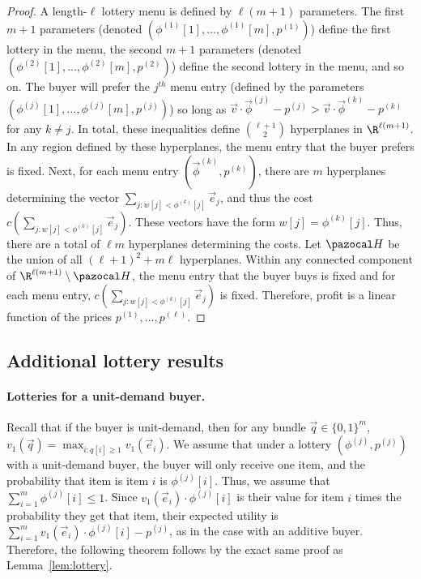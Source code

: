 \lottery*

\begin{proof}
	A length-$\ell$ lottery menu is defined by $\ell(m+1)$ parameters. The first $m+1$ parameters (denoted $\left(\phi^{(1)}[1], \dots, \phi^{(1)}[m], p^{(1)}\right)$) define the first lottery in the menu, the second $m+1$ parameters (denoted $\left(\phi^{(2)}[1], \dots, \phi^{(2)}[m], p^{(2)}\right)$) define the second lottery in the menu, and so on. The buyer will prefer the $j^{th}$ menu entry (defined by the parameters $\left(\phi^{(j)}[1], \dots, \phi^{(j)}[m], p^{(j)}\right)$)  so long as
	$\vec{v} \cdot \vec{\phi}^{(j)} - p^{(j)}> \vec{v} \cdot \vec{\phi}^{(k)}- p^{(k)}$ for any $k \not=j$. In total, these inequalities define ${\ell+1 \choose 2}$ hyperplanes in $\R^{\ell(m+1)}$. In any region defined by these hyperplanes, the menu entry that the buyer prefers is fixed. Next, for each menu entry $\left(\vec{\phi}^{(k)}, p^{(k)}\right)$, there are $m$ hyperplanes determining the vector $\sum_{j: w[j] < \phi^{(k)}[j]} \vec{e}_j$, and thus the cost  $c \left(\sum_{j: w[j] < \phi^{(k)}[j]} \vec{e}_j\right)$. These vectors have the form $w[j] = \phi^{(k)}[j].$ Thus, there are a total of $\ell m$ hyperplanes determining the costs. Let $\hyp$ be the union of all $(\ell+1)^2 + m \ell$ hyperplanes. Within any connected component of $\R^{\ell(m+1)}\setminus \hyp$, the menu entry that the buyer buys is fixed and for each menu entry, $c \left(\sum_{j: w[j] < \phi^{(k)}[j]} \vec{e}_j\right)$ is fixed. Therefore, profit is a linear function of the prices $p^{(1)}, \dots, p^{(\ell)}$.
\end{proof}

\subsection{Additional lottery results}\label{sec:additional_lotteries}

\paragraph{Lotteries for a unit-demand buyer.} Recall that if the buyer is unit-demand, then for any bundle $\vec{q} \in \{0,1\}^m$, $v_1\left(\vec{q}\right) = \max_{i : q[i] \geq 1} v_1\left(\vec{e}_i\right)$. We assume that under a lottery $\left(\phi^{(j)}, p^{(j)}\right)$ with a unit-demand buyer, the buyer will only receive one item, and the probability that item is item $i$ is $\phi^{(j)}[i]$. Thus, we assume that $\sum_{i = 1}^m \phi^{(j)}[i] \leq 1$. Since $v_1(\vec{e}_i)\cdot \phi^{(j)}[i]$ is their value for item $i$ times the probability they get that item, their expected utility is $\sum_{i = 1}^m v_1(\vec{e}_i) \cdot \phi^{(j)}[i] - p^{(j)}$, as in the case with an additive buyer. Therefore, the following theorem follows by the exact same proof as Lemma~\ref{lem:lottery}.

